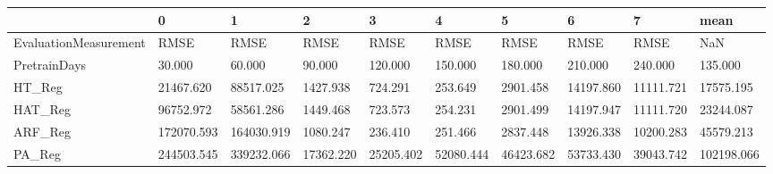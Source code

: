 \begin{tabular}{llllllllll}
\toprule
{} &          0 &          1 &         2 &         3 &         4 &         5 &         6 &         7 &       mean \\
\midrule
EvaluationMeasurement &       RMSE &       RMSE &      RMSE &      RMSE &      RMSE &      RMSE &      RMSE &      RMSE &        NaN \\
PretrainDays          &     30.000 &     60.000 &    90.000 &   120.000 &   150.000 &   180.000 &   210.000 &   240.000 &    135.000 \\
HT\_Reg                &  21467.620 &  88517.025 &  1427.938 &   724.291 &   253.649 &  2901.458 & 14197.860 & 11111.721 &  17575.195 \\
HAT\_Reg               &  96752.972 &  58561.286 &  1449.468 &   723.573 &   254.231 &  2901.499 & 14197.947 & 11111.720 &  23244.087 \\
ARF\_Reg               & 172070.593 & 164030.919 &  1080.247 &   236.410 &   251.466 &  2837.448 & 13926.338 & 10200.283 &  45579.213 \\
PA\_Reg                & 244503.545 & 339232.066 & 17362.220 & 25205.402 & 52080.444 & 46423.682 & 53733.430 & 39043.742 & 102198.066 \\
\bottomrule
\end{tabular}

